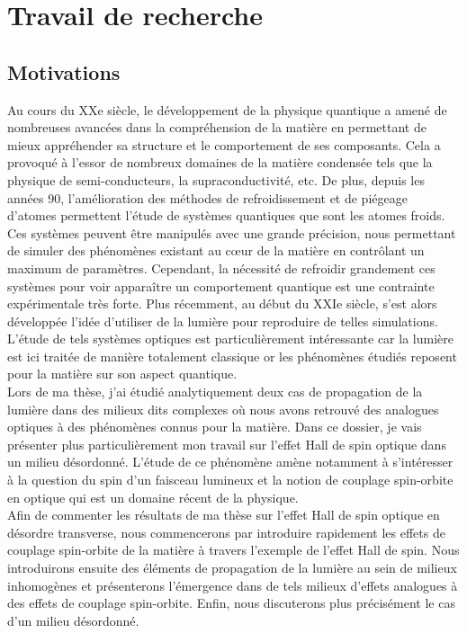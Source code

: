 \documentclass[a4paper,11pt]{article} %
\begin{document}
	
	\section{Travail de recherche}
	\subsection{Motivations}
	Au cours du XXe siècle, le développement de la physique quantique a amené de nombreuses avancées dans la compréhension de la matière en permettant de mieux appréhender sa structure et le comportement de ses composants. Cela a provoqué à l'essor de nombreux domaines de la matière condensée tels que la physique de semi-conducteurs, la supraconductivité, etc. De plus, depuis les années 90, l'amélioration des méthodes de refroidissement et de piégeage d'atomes permettent l'étude de systèmes quantiques que sont les atomes froids. Ces systèmes peuvent être manipulés avec une grande précision, nous permettant de simuler des phénomènes existant au c\oe ur de la matière en contrôlant un maximum de paramètres. Cependant, la nécessité de refroidir grandement ces systèmes pour voir apparaître un comportement quantique est une contrainte expérimentale très forte. Plus récemment, au début du XXIe siècle, s'est alors développée l'idée d'utiliser de la lumière pour reproduire de telles simulations. L'étude de tels systèmes optiques est particulièrement intéressante car la lumière est ici traitée de manière totalement classique or les phénomènes étudiés reposent pour la matière sur son aspect quantique.\\
	
	Lors de ma thèse, j'ai étudié analytiquement deux cas de propagation de la lumière dans des milieux dits complexes où nous avons retrouvé des analogues optiques à des phénomènes connus pour la matière. Dans ce dossier, je vais présenter plus particulièrement mon travail sur l'effet Hall de spin optique dans un milieu désordonné. L'étude de ce phénomène amène notamment à s'intéresser à la question du spin d'un faisceau lumineux et la notion de couplage spin-orbite en optique qui est un domaine récent de la physique.\\
	
	Afin de commenter les résultats de ma thèse sur l'effet Hall de spin optique en désordre transverse, nous commencerons par introduire rapidement les effets de couplage spin-orbite de la matière à travers l'exemple de l'effet Hall de spin. Nous introduirons ensuite des éléments de propagation de la lumière au sein de milieux inhomogènes et présenterons l'émergence dans de tels milieux d'effets analogues à des effets de couplage spin-orbite. Enfin, nous discuterons plus précisément le cas d'un milieu désordonné. \\
	
\end{document}
